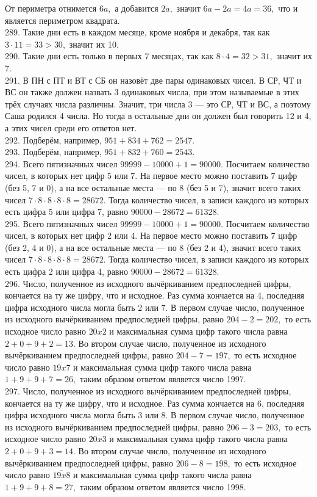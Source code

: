 \documentclass[12pt]{article}
\begin{document}
От периметра отнимется $6a,$ а добавится $2a,$ значит $6a-2a=4a=36,$ что и является периметром квадрата.\\
289. Такие дни есть в каждом месяце, кроме ноября и декабря, так как $3\cdot11=33>30,$ значит их 10.\\
290. Такие дни есть только в первых 7 месяцах, так как $8\cdot4=32>31,$ значит их 7.\\
291. В ПН с ПТ и ВТ с СБ он назовёт две пары одинаковых чисел. В СР, ЧТ и ВС он также должен назвать 3 одинаковых числа, при этом называемые в этих трёх случаях числа различны. Значит, три числа 3 --- это СР, ЧТ и ВС, а поэтому Саша родился 4 числа. Но тогда в остальные дни он должен был говорить 12 и 4, а этих чисел среди его ответов нет.\\
292. Подберём, например, $951+834+762=2547.$\\
293. Подберём, например, $951+832+760=2543.$\\
294. Всего пятизначных чисел $99999-10000+1=90000.$ Посчитаем количество чисел, в которых нет цифр 5 или 7. На первое место можно поставить 7 цифр (без 5, 7 и 0), а на все остальные места --- по 8 (без 5 и 7), значит всего таких чисел $7\cdot8\cdot8\cdot8\cdot8=28672.$ Тогда количество чисел, в записи каждого из которых есть цифра 5 или цифра 7, равно $90000-28672=61328.$\\
295. Всего пятизначных чисел $99999-10000+1=90000.$ Посчитаем количество чисел, в которых нет цифр 2 или 4. На первое место можно поставить 7 цифр (без 2, 4 и 0), а на все остальные места --- по 8 (без 2 и 4), значит всего таких чисел $7\cdot8\cdot8\cdot8\cdot8=28672.$ Тогда количество чисел, в записи каждого из которых есть цифра 2 или цифра 4, равно $90000-28672=61328.$\\
296. Число, полученное из исходного вычёркиванием предпоследней цифры, кончается на ту же цифру, что и исходное. Раз сумма кончается на 4, последняя цифра исходного числа могла быть 2 или 7. В первом случае число, полученное из исходного вычёркиванием предпоследней цифры, равно $204-2=202,$ то есть исходное число равно $\overline{20x2}$ и максимальная сумма цифр такого числа равна $2+0+9+2=13.$ Во втором случае число, полученное из исходного вычёркиванием предпоследней цифры, равно $204-7=197,$ то есть исходное число равно $\overline{19x7}$ и максимальная сумма цифр такого числа равна $1+9+9+7=26,$ таким образом ответом является число 1997.\\
297. Число, полученное из исходного вычёркиванием предпоследней цифры, кончается на ту же цифру, что и исходное. Раз сумма кончается на 6, последняя цифра исходного числа могла быть 3 или 8. В первом случае число, полученное из исходного вычёркиванием предпоследней цифры, равно $206-3=203,$ то есть исходное число равно $\overline{20x3}$ и максимальная сумма цифр такого числа равна $2+0+9+3=14.$ Во втором случае число, полученное из исходного вычёркиванием предпоследней цифры, равно $206-8=198,$ то есть исходное число равно $\overline{19x8}$ и максимальная сумма цифр такого числа равна $1+9+9+8=27,$ таким образом ответом является число 1998.\\
\end{document}
